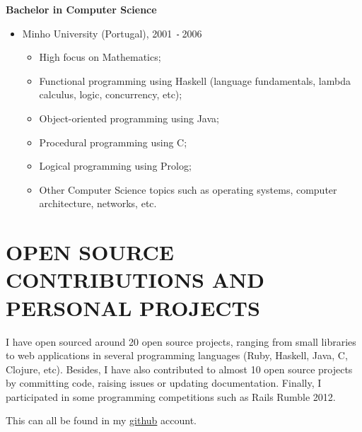 \documentclass{res}
\def\Minus{\texttt{-}\,}
\begin{document}
\begin{resume}
    {\bf Bachelor in Computer Science}
    \begin{itemize}
      \item[] Minho University (Portugal), 2001 \Minus 2006
      \begin{itemize}
        \item High focus on Mathematics;
        \item Functional programming using Haskell (language fundamentals, lambda calculus, logic, concurrency, etc);
        \item Object-oriented programming using Java;
        \item Procedural programming using C;
        \item Logical programming using Prolog;
        \item Other Computer Science topics such as operating systems, computer architecture, networks, etc.
      \end{itemize}
    \end{itemize}

\section{OPEN SOURCE CONTRIBUTIONS AND PERSONAL PROJECTS}
\vspace{0.1in}

    I have open sourced around 20 open source projects, ranging from small libraries to web applications in several programming languages (Ruby, Haskell, Java, C, Clojure, etc). Besides, I have also contributed to almost 10 open source projects by committing code, raising issues or updating documentation. Finally, I participated in some programming competitions such as Rails Rumble 2012.

    This can all be found in my \href{http://github.com/carvil}{github} account.

\end{resume}
\end{document}

